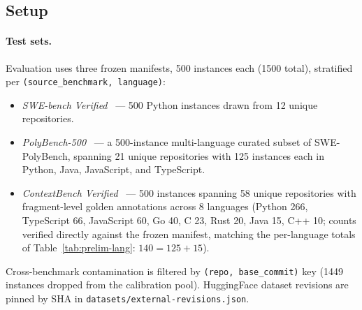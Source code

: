 \documentclass[11pt, a4paper]{article}
\begin{document}
\subsection{Setup}

\paragraph{Test sets.} Evaluation uses three frozen manifests, 500 instances each (1500 total), stratified per \texttt{(source\_benchmark, language)}:
\begin{itemize}
    \item \emph{SWE-bench Verified}~\cite{jimenez2024swebench,openai2024swebenchverified} --- 500 Python instances drawn from 12 unique repositories.
    \item \emph{PolyBench-500}~\cite{rashid2025swepolybench} --- a 500-instance multi-language curated subset of SWE-PolyBench, spanning 21 unique repositories with 125 instances each in Python, Java, JavaScript, and TypeScript.
    \item \emph{ContextBench Verified}~\cite{li2026contextbench} --- 500 instances spanning 58 unique repositories with fragment-level golden annotations across 8 languages (Python 266, TypeScript 66, JavaScript 60, Go 40, C 23, Rust 20, Java 15, C++ 10; counts verified directly against the frozen manifest, matching the per-language totals of Table~\ref{tab:prelim-lang}: $140 = 125 + 15$).
\end{itemize}
Cross-benchmark contamination is filtered by \texttt{(repo, base\_commit)} key (1449 instances dropped from the calibration pool). HuggingFace dataset revisions are pinned by SHA in \texttt{datasets/external-revisions.json}.
\end{document}
